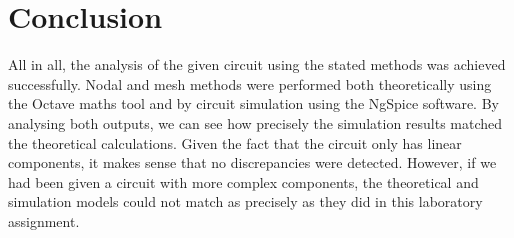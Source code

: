 \section{Conclusion}
\label{sec:conclusion}

All in all, the analysis of the given circuit using the stated methods was achieved successfully. Nodal and mesh methods were performed both
theoretically using the Octave maths tool and by circuit simulation using the
NgSpice software. By analysing both outputs, we can see how precisely the simulation results matched the theoretical calculations. 
Given the fact that the circuit only has linear components, it makes sense that no discrepancies were detected. However, 
if we had been given a circuit with more complex components, the theoretical and simulation models could not match as precisely 
as they did in this laboratory assignment.

